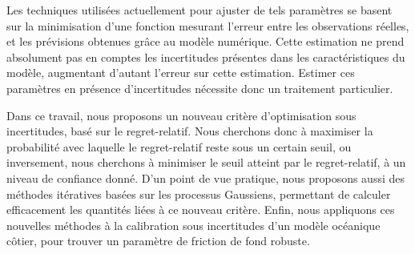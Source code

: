 Les techniques utilisées actuellement
pour ajuster de tels paramètres se basent sur la minimisation d'une
fonction mesurant l'erreur entre les observations réelles, et les
prévisions obtenues grâce au modèle numérique. Cette estimation ne
prend absolument pas en comptes les incertitudes présentes dans les
caractéristiques du modèle, augmentant d'autant l'erreur sur cette
estimation. Estimer ces paramètres en présence d'incertitudes
nécessite donc un traitement particulier.

Dans ce travail, nous proposons un nouveau critère d'optimisation sous
incertitudes, basé sur le regret-relatif. Nous cherchons donc à
maximiser la probabilité avec laquelle le regret-relatif reste sous un
certain seuil, ou inversement, nous cherchons à minimiser le seuil
atteint par le regret-relatif, à un niveau de confiance donné.  D'un
point de vue pratique, nous proposons aussi des méthodes itératives
basées sur les processus Gaussiens, permettant de calculer
efficacement les quantités liées à ce nouveau critère.  Enfin, nous
appliquons ces nouvelles méthodes à la calibration sous incertitudes
d'un modèle océanique côtier, pour trouver un paramètre de friction de
fond robuste.
\restoregeometry